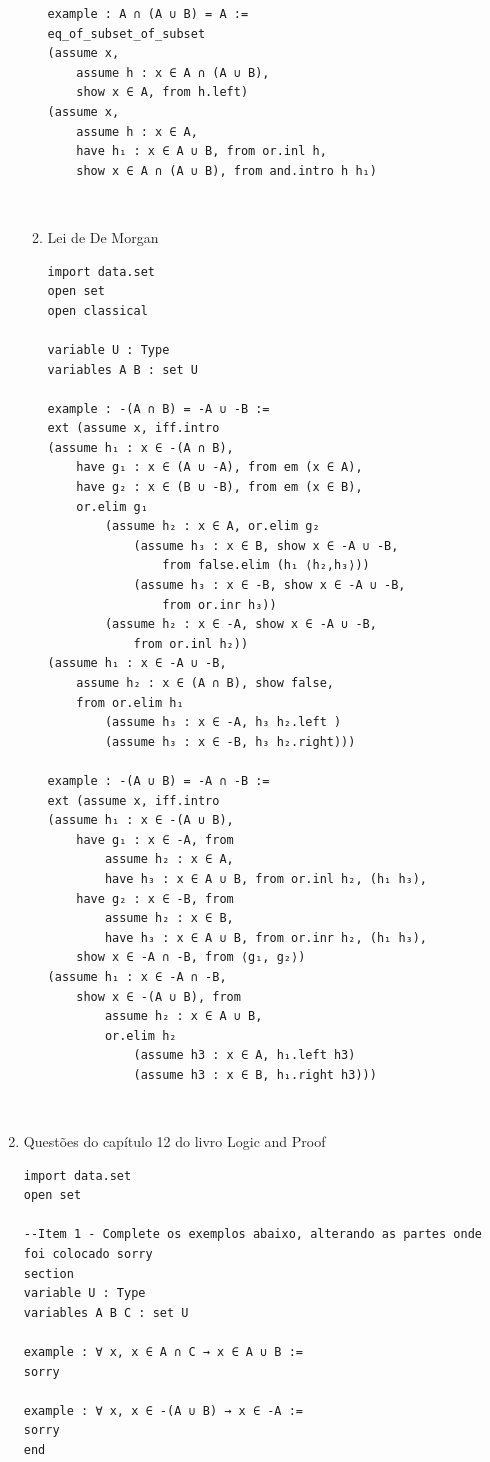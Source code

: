 \begin{enumerate}
\begin{enumerate}
\begin{lstlisting}
example : A ∩ (A ∪ B) = A :=
eq_of_subset_of_subset
(assume x,
    assume h : x ∈ A ∩ (A ∪ B),
    show x ∈ A, from h.left)
(assume x,
    assume h : x ∈ A,
    have h₁ : x ∈ A ∪ B, from or.inl h,
    show x ∈ A ∩ (A ∪ B), from and.intro h h₁) \end{lstlisting}

$\qquad$
\item Lei de De Morgan
\begin{lstlisting}
import data.set
open set
open classical

variable U : Type
variables A B : set U

example : -(A ∩ B) = -A ∪ -B :=
ext (assume x, iff.intro
(assume h₁ : x ∈ -(A ∩ B),
    have g₁ : x ∈ (A ∪ -A), from em (x ∈ A),
    have g₂ : x ∈ (B ∪ -B), from em (x ∈ B),
    or.elim g₁
        (assume h₂ : x ∈ A, or.elim g₂
            (assume h₃ : x ∈ B, show x ∈ -A ∪ -B,
                from false.elim (h₁ ⟨h₂,h₃⟩))
            (assume h₃ : x ∈ -B, show x ∈ -A ∪ -B,
                from or.inr h₃))
        (assume h₂ : x ∈ -A, show x ∈ -A ∪ -B,
            from or.inl h₂))
(assume h₁ : x ∈ -A ∪ -B,
    assume h₂ : x ∈ (A ∩ B), show false,
    from or.elim h₁
        (assume h₃ : x ∈ -A, h₃ h₂.left )
        (assume h₃ : x ∈ -B, h₃ h₂.right)))

example : -(A ∪ B) = -A ∩ -B :=
ext (assume x, iff.intro
(assume h₁ : x ∈ -(A ∪ B),
    have g₁ : x ∈ -A, from
        assume h₂ : x ∈ A,
        have h₃ : x ∈ A ∪ B, from or.inl h₂, (h₁ h₃),
    have g₂ : x ∈ -B, from
        assume h₂ : x ∈ B,
        have h₃ : x ∈ A ∪ B, from or.inr h₂, (h₁ h₃),
    show x ∈ -A ∩ -B, from ⟨g₁, g₂⟩)
(assume h₁ : x ∈ -A ∩ -B,
    show x ∈ -(A ∪ B), from
        assume h₂ : x ∈ A ∪ B,
        or.elim h₂
            (assume h3 : x ∈ A, h₁.left h3)
            (assume h3 : x ∈ B, h₁.right h3))) \end{lstlisting}

\end{enumerate}

$\qquad$

\item Questões do capítulo 12 do livro Logic and Proof
\begin{lstlisting}
import data.set
open set

--Item 1 - Complete os exemplos abaixo, alterando as partes onde foi colocado sorry
section
variable U : Type
variables A B C : set U

example : ∀ x, x ∈ A ∩ C → x ∈ A ∪ B :=
sorry

example : ∀ x, x ∈ -(A ∪ B) → x ∈ -A :=
sorry
end



\end{lstlisting}
\end{enumerate}
